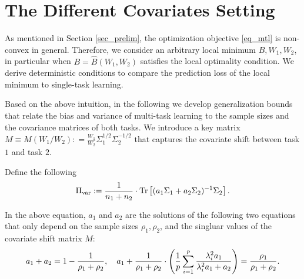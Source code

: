 \section{The Different Covariates Setting}
As mentioned in Section \ref{sec_prelim}, the optimization objective \eqref{eq_mtl} is non-convex in general.
Therefore, we consider an arbitrary local minimum $B, W_1, W_2$, in particular when $B = \hat{B}(W_1, W_2)$ satisfies the local optimality condition.
We derive deterministic conditions to compare the prediction loss of the local minimum to single-task learning.


Based on the above intuition, in the following we develop generalization bounds that relate the bias and variance of multi-task learning to the sample sizes and the covariance matrices of both tasks.
We introduce a key matrix $M\equiv M(W_1/W_2): =\frac{W_1}{W_2} \Sigma_1^{1/2}\Sigma_2^{-1/2}$ that captures the covariate shift between task $1$ and task $2$.

\begin{definition}
	Define the following
	\[ \Pi_{\text{var}} := \frac{1}{n_1 + n_2}\cdot \operatorname{Tr}\left[ (a_1 \Sigma_1 + a_2\Sigma_2)^{-1} \Sigma_2\right]. \]

	In the above equation, $a_1$ and $a_2$ are the solutions of the following two equations that only depend on the sample sizes $\rho_1, \rho_2$, and the singluar values of the covariate shift matrix $M$:
	\begin{align}
		a_1 + a_2 = 1- \frac{1}{\rho_1 + \rho_2},\quad a_1 + \frac1{\rho_1 + \rho_2}\cdot \left({\frac{1}{p}\sum_{i=1}^p \frac{\lambda_i^2 a_1}{\lambda_i^2 a_1 + a_2}}\right) = \frac{\rho_1}{\rho_1 + \rho_2}. \label{eq_a12extra}
	\end{align}
\end{definition}

